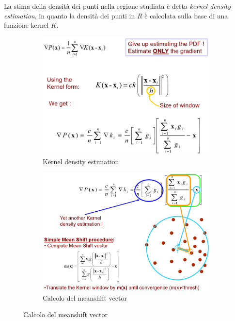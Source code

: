 \documentclass[a4paper,oneside,titlepage]{book}
\begin{document}
La stima della densità dei punti nella regione studiata è detta \textit{kernel density estimation}, in quanto la densità dei punti in $R$ è calcolata sulla base di una funzione kernel $K$.
\begin{figure}[htp]
	\begin{subfigure}{0.49\textwidth}
	    \centering
		\includegraphics[width=\textwidth, height=\textheight, keepaspectratio]{ms1.png}
		\caption{Kernel density estimation}
	\end{subfigure}
	\hfill
	\begin{subfigure}{0.49\textwidth}
	    \centering
		\includegraphics[width=\textwidth, height=\textheight, keepaspectratio]{ms2.png}
		\caption{Calcolo del meanshift vector}
	\end{subfigure}
\end{figure}
\end{document}
